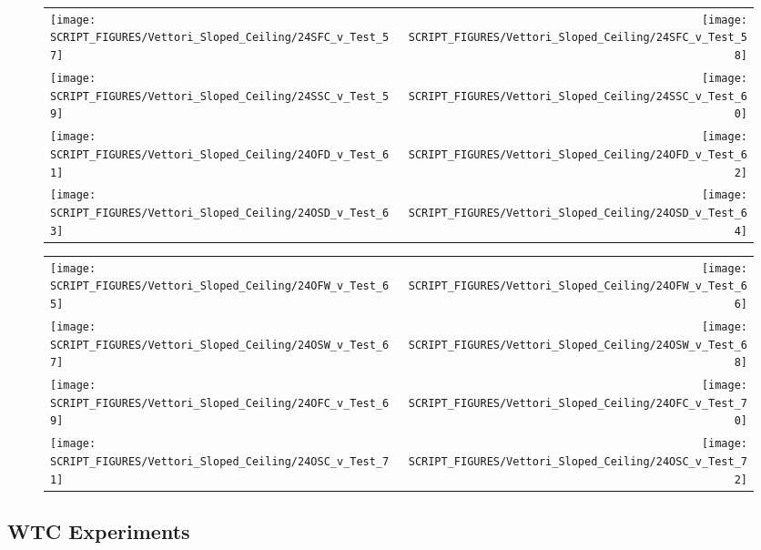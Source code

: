 \begin{figure}[p]
\begin{tabular*}{\textwidth}{l@{\extracolsep{\fill}}r}
\texttt{[image: SCRIPT\_FIGURES/Vettori\_Sloped\_Ceiling/24SFC\_v\_Test\_57]} &
\texttt{[image: SCRIPT\_FIGURES/Vettori\_Sloped\_Ceiling/24SFC\_v\_Test\_58]} \\
\texttt{[image: SCRIPT\_FIGURES/Vettori\_Sloped\_Ceiling/24SSC\_v\_Test\_59]} &
\texttt{[image: SCRIPT\_FIGURES/Vettori\_Sloped\_Ceiling/24SSC\_v\_Test\_60]} \\
\texttt{[image: SCRIPT\_FIGURES/Vettori\_Sloped\_Ceiling/24OFD\_v\_Test\_61]} &
\texttt{[image: SCRIPT\_FIGURES/Vettori\_Sloped\_Ceiling/24OFD\_v\_Test\_62]} \\
\texttt{[image: SCRIPT\_FIGURES/Vettori\_Sloped\_Ceiling/24OSD\_v\_Test\_63]} &
\texttt{[image: SCRIPT\_FIGURES/Vettori\_Sloped\_Ceiling/24OSD\_v\_Test\_64]} \\
\end{tabular*}
\label{Vettori_Sloped_8}
\end{figure}

\begin{figure}[p]
\begin{tabular*}{\textwidth}{l@{\extracolsep{\fill}}r}
\texttt{[image: SCRIPT\_FIGURES/Vettori\_Sloped\_Ceiling/24OFW\_v\_Test\_65]} &
\texttt{[image: SCRIPT\_FIGURES/Vettori\_Sloped\_Ceiling/24OFW\_v\_Test\_66]} \\
\texttt{[image: SCRIPT\_FIGURES/Vettori\_Sloped\_Ceiling/24OSW\_v\_Test\_67]} &
\texttt{[image: SCRIPT\_FIGURES/Vettori\_Sloped\_Ceiling/24OSW\_v\_Test\_68]} \\
\texttt{[image: SCRIPT\_FIGURES/Vettori\_Sloped\_Ceiling/24OFC\_v\_Test\_69]} &
\texttt{[image: SCRIPT\_FIGURES/Vettori\_Sloped\_Ceiling/24OFC\_v\_Test\_70]} \\
\texttt{[image: SCRIPT\_FIGURES/Vettori\_Sloped\_Ceiling/24OSC\_v\_Test\_71]} &
\texttt{[image: SCRIPT\_FIGURES/Vettori\_Sloped\_Ceiling/24OSC\_v\_Test\_72]} \\
\end{tabular*}
\label{Vettori_Sloped_9}
\end{figure}

\clearpage




\subsection{WTC Experiments}

